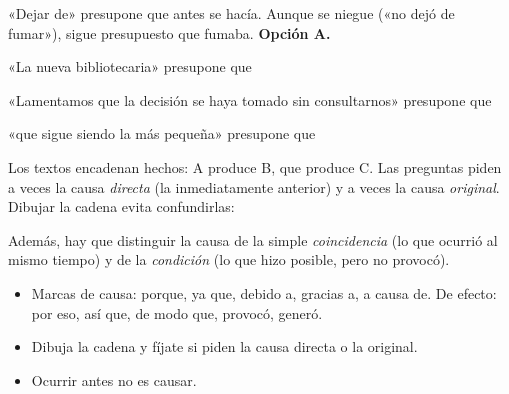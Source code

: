 \begin{retoresuelto}
«Dejar de» presupone que antes se hacía. Aunque se niegue («no dejó de fumar»), sigue presupuesto que fumaba.
\textbf{Opción A.}
\end{retoresuelto}

\taller
{}
\begin{ejercicios}
\item «La nueva bibliotecaria» presupone que
\item «Lamentamos que la decisión se haya tomado sin consultarnos» presupone que
\item «que sigue siendo la más pequeña»  presupone que
\end{ejercicios}

\bitacora


Los textos encadenan hechos: A produce B, que produce C. Las preguntas piden a veces la causa \emph{directa} (la
inmediatamente anterior) y a veces la causa \emph{original}. Dibujar la cadena evita confundirlas:


Además, hay que distinguir la causa de la simple \emph{coincidencia} (lo que ocurrió al mismo tiempo) y de la
\emph{condición} (lo que hizo posible, pero no provocó).

\begin{regla}
\begin{itemize}
  \item Marcas de causa: porque, ya que, debido a, gracias a, a causa de. De efecto: por eso, así que, de modo que,
  provocó, generó.
  \item Dibuja la cadena y fíjate si piden la causa directa o la original.
  \item Ocurrir antes no es causar.
\end{itemize}
\end{regla}

